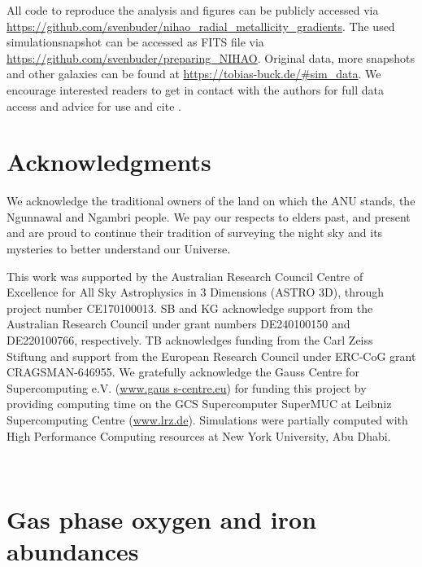 \documentclass[twocolumn,apj,numberedappendix,appendixfloats,twocolappendix]{openjournal}
\begin{document}
\begin{CJK*}{UTF8}{gbsn}
All code to reproduce the analysis and figures can be publicly accessed via \url{https://github.com/svenbuder/nihao_radial_metallicity_gradients}. The used simulationsnapshot can be accessed as FITS file via \url{https://github.com/svenbuder/preparing_NIHAO}. Original data, more snapshots and other galaxies can be found at \url{https://tobias-buck.de/#sim_data}. We encourage interested readers to get in contact with the authors for full data access and advice for use and cite \citet{Buck2020b, Buck2021}.

\section*{Acknowledgments}

We acknowledge the traditional owners of the land on which the ANU stands, the Ngunnawal and Ngambri people. We pay our respects to elders past, and present and are proud to continue their tradition of surveying the night sky and its mysteries to better understand our Universe.

This work was supported by the Australian Research Council Centre of Excellence for All Sky Astrophysics in 3 Dimensions (ASTRO 3D), through project number CE170100013. SB and KG acknowledge support from the Australian Research Council under grant numbers DE240100150 and DE220100766, respectively. TB acknowledges funding from the Carl Zeiss Stiftung and support from the European Research Council under ERC-CoG grant CRAGSMAN-646955. We gratefully acknowledge the Gauss Centre for Supercomputing e.V. (\url{www.gaus s-centre.eu}) for funding this project by providing computing time on the GCS Supercomputer SuperMUC at Leibniz Supercomputing Centre (\url{www.lrz.de}). Simulations were partially computed with High Performance Computing resources at New York University, Abu Dhabi.


\end{CJK*}



$\,$
\clearpage$\,$

\appendix

\section{Gas phase oxygen and iron abundances} \label{sec:app_a}
\end{document}
